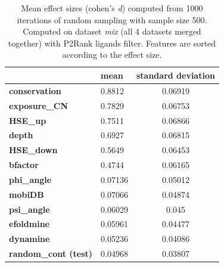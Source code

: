 \begin{table}[]
\centering
\begin{tabular}{@{}llc@{}}
\toprule
                      & \textbf{mean} & \textbf{standard deviation} \\ \midrule
\textbf{conservation} & 0.8812        & 0.06919           \\
\textbf{exposure\_CN} & 0.7829        & 0.06753           \\
\textbf{HSE\_up}      & 0.7511        & 0.06866           \\
\textbf{depth}        & 0.6927        & 0.06815           \\
\textbf{HSE\_down}    & 0.5649        & 0.06453           \\
\textbf{bfactor}      & 0.4744        & 0.06165           \\
\textbf{phi\_angle}   & 0.07136       & 0.05012           \\
\textbf{mobiDB}       & 0.07066       & 0.04874           \\
\textbf{psi\_angle}   & 0.06029       & 0.045             \\
\textbf{efoldmine}    & 0.05961       & 0.04477           \\
\textbf{dynamine}     & 0.05236       & 0.04086           \\
\textbf{random\_cont (test)} & 0.04968       & 0.03807           \\ \bottomrule
\end{tabular}
\caption[Mean effect sizes (cohen's \textit{d})]{Mean effect sizes (cohen's \textit{d}) computed from 1000 iterations of random sampling with sample size 500. Computed on dataset \textit{mix} (all 4 datasets merged together) with P2Rank ligands filter. Features are sorted according to the effect size.}
\label{tab:cohensd500}
\end{table}

